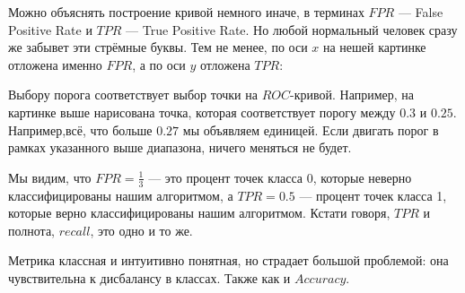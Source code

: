 \documentclass[12pt, a4paper, oneside]{article}
\theoremstyle{plain} %
\theoremstyle{definition}
\begin{document}
\begin{solution}
\begin{enumerate}
	Можно объяснять построение кривой немного иначе, в терминах $FPR$ --- False Positive Rate и $TPR$ --- True Positive Rate. Но любой нормальный человек сразу же забывет эти стрёмные буквы. Тем не менее, по оси $x$ на нешей картинке отложена именно $FPR$, а по оси $y$ отложена $TPR$: 
	
\begin{center}
\end{center}

	Выбору порога соответствует выбор точки на $ROC$-кривой. Например, на картинке выше нарисована точка, которая соответствует порогу между $0.3$ и $0.25$. Например,всё, что больше $0.27$ мы объявляем единицей. Если двигать порог в рамках указанного выше диапазона, ничего меняться не будет.
	
	Мы видим, что $FPR = \frac{1}{3}$ --- это процент точек класса 0, которые неверно классифицированы нашим алгоритмом, а $TPR = 0.5$ --- процент точек класса 1, которые верно классифицированы нашим алгоритмом. Кстати говоря, $TPR$ и полнота, $recall$, это одно и то же.
	
    Метрика классная и интуитивно понятная, но страдает большой проблемой: она чувствительна к дисбалансу в классах. Также как и $Accuracy$.
    

\end{enumerate}
\end{solution}
\end{document}
